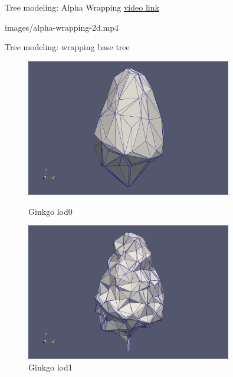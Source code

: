 \documentclass[10pt]{beamer}
\begin{document}
\begin{frame}{Tree modeling: Alpha Wrapping}
  \Large
  \href{https://youtu.be/xIIDolWCrgU}{video link}
  \begin{center}
    \movie[width=1\textwidth,height=0.8\textheight,poster,showcontrols]{}
    {images/alpha-wrapping-2d.mp4}
\end{center}
\end{frame}

\begin{frame}{Tree modeling: wrapping base tree}
  \Large
  \begin{figure}[H]
    \centering
    \begin{minipage}{0.49\textwidth}
        \centering
        \includegraphics[width=0.8\textwidth]{images/gingko_lod0.png}
        \caption{Ginkgo lod0}
    \end{minipage}\hfill
    \begin{minipage}{0.49\textwidth}
        \centering
        \includegraphics[width=0.8\textwidth]{images/gingko_lod1.png}
        \caption{Ginkgo lod1}
    \end{minipage}
\end{figure}


\end{frame}
\end{document}
